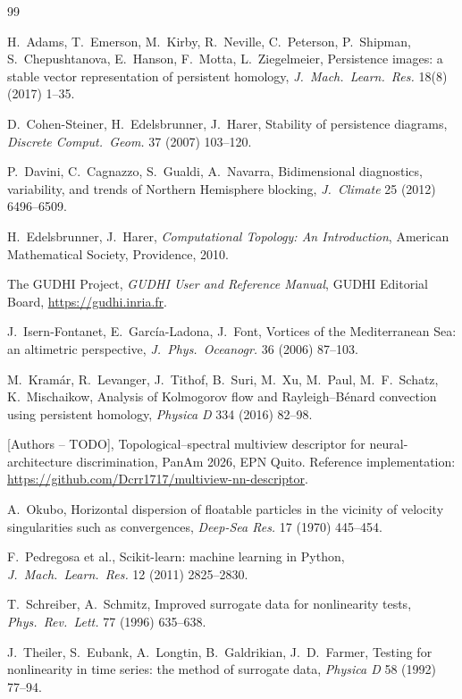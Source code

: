 \documentclass[11pt,a4paper]{article}
\begin{document}
\begin{thebibliography}{99}\small

 H.~Adams, T.~Emerson, M.~Kirby, R.~Neville, C.~Peterson,
P.~Shipman, S.~Chepushtanova, E.~Hanson, F.~Motta, L.~Ziegelmeier,
Persistence images: a stable vector representation of persistent homology,
\emph{J.\ Mach.\ Learn.\ Res.} 18(8) (2017) 1--35.

 D.~Cohen-Steiner, H.~Edelsbrunner, J.~Harer,
Stability of persistence diagrams, \emph{Discrete Comput.\ Geom.} 37 (2007)
103--120.

 P.~Davini, C.~Cagnazzo, S.~Gualdi, A.~Navarra,
Bidimensional diagnostics, variability, and trends of Northern Hemisphere
blocking, \emph{J.\ Climate} 25 (2012) 6496--6509.

 H.~Edelsbrunner, J.~Harer, \emph{Computational
Topology: An Introduction}, American Mathematical Society, Providence, 2010.

 The GUDHI Project, \emph{GUDHI User and Reference Manual},
GUDHI Editorial Board, \url{https://gudhi.inria.fr}.

 J.~Isern-Fontanet, E.~Garc\'ia-Ladona, J.~Font, Vortices
of the Mediterranean Sea: an altimetric perspective, \emph{J.\ Phys.\
Oceanogr.} 36 (2006) 87--103.

 M.~Kram\'ar, R.~Levanger, J.~Tithof, B.~Suri, M.~Xu,
M.~Paul, M.~F.~Schatz, K.~Mischaikow, Analysis of Kolmogorov flow and
Rayleigh--B\'enard convection using persistent homology, \emph{Physica D} 334
(2016) 82--98.

 [Authors -- TODO], Topological--spectral multiview
descriptor for neural-architecture discrimination, PanAm 2026, EPN Quito.
Reference implementation:
\url{https://github.com/Dcrr1717/multiview-nn-descriptor}. %

 A.~Okubo, Horizontal dispersion of floatable particles in
the vicinity of velocity singularities such as convergences, \emph{Deep-Sea
Res.} 17 (1970) 445--454.

 F.~Pedregosa et al., Scikit-learn: machine learning in
Python, \emph{J.\ Mach.\ Learn.\ Res.} 12 (2011) 2825--2830.

 T.~Schreiber, A.~Schmitz, Improved surrogate data for
nonlinearity tests, \emph{Phys.\ Rev.\ Lett.} 77 (1996) 635--638.

 J.~Theiler, S.~Eubank, A.~Longtin, B.~Galdrikian,
J.~D.~Farmer, Testing for nonlinearity in time series: the method of
surrogate data, \emph{Physica D} 58 (1992) 77--94.


\end{thebibliography}
\end{document}
